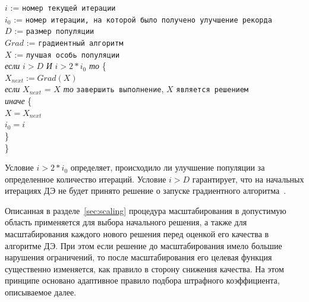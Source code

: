 \begin{flushleft}
\small
$i$ := \verb"номер текущей итерации" \\
$i_0$ := \verb"номер итерации, на которой было получено улучшение рекорда"\\
$D$ := \verb"размер популяции"\\
$Grad$ := \verb"градиентный алгоритм"\\
$X$ := \verb"лучшая особь популяции"\\

\textit{если} $i > D$ \textit{И} $i > 2 * i_0$ \textit{то} \{\\
\leftskip=12pt
    $X_{next} := Grad(X)$\\
    \textit{если} $X_{next}$ = $X$ \textit{то} \verb"завершить выполнение", $X$ \verb"является решением"\\
    \textit{иначе} \{\\
    \leftskip=24pt
        $X = X_{next}$\\
        $i_0 = i$\\
        \leftskip=12pt
    \}\\
    \leftskip=0pt
\}
\end{flushleft}
Условие $i > 2 * i_0$ определяет, происходило ли улучшение популяции за определенное количество итераций. Условие $i > D$ гарантирует, что на начальных итерациях ДЭ не будет принято решение о запуске градиентного алгоритма~\cite{eremeev:restart}.


Описанная в разделе~\ref{sec:scaling} процедура масштабирования в допустимую область применяется для выбора начального решения, а также для масштабирования каждого нового решения перед оценкой его качества в алгоритме ДЭ. При этом если решение до масштабирования имело большие нарушения ограничений, то после масштабирования его целевая функция существенно изменяется, как правило в сторону снижения качества. На этом принципе основано адаптивное правило подбора штрафного коэффициента, описываемое далее.

